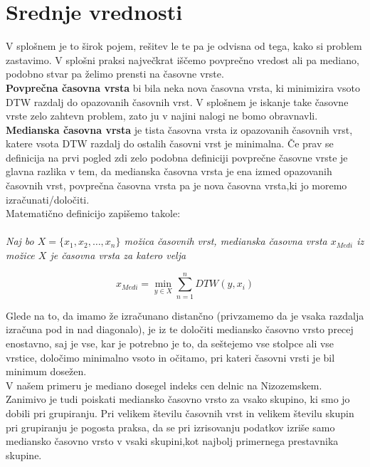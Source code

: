 \documentclass[12pt,a4paper]{article}
\begin{document}
\section{Srednje vrednosti}
V splošnem je to širok pojem, rešitev le te pa je odvisna od tega, kako si problem zastavimo.
V splošni praksi največkrat iščemo povprečno vredost ali pa mediano, podobno stvar pa želimo prensti na 
časovne vrste.\\

\textbf{Povprečna časovna vrsta} bi bila neka nova časovna vrsta, ki minimizira vsoto DTW razdalj
do opazovanih časovnih vrst. V splošnem je iskanje take časovne vrste zelo zahtevn problem, zato ju v najini
nalogi ne bomo obravnavli.\\

\textbf{Medianska časovna vrsta} je tista časovna vrsta iz opazovanih časovnih vrst, katere vsota DTW razdalj
do ostalih časovni vrst je minimalna. Če prav se definicija na prvi pogled zdi zelo podobna definiciji
povprečne časovne vrste je glavna razlika v tem, da medianska časovna vrsta je ena izmed opazovanih časovnih vrst,
povprečna časovna vrsta pa je nova časovna vrsta,ki jo moremo
izračunati/določiti.\\

Matematično definicijo zapišemo takole:\\
\\
\emph{Naj bo $X=\{x_{1},x_{2},\dots,x_{n}\}$ možica časovnih vrst, medianska časovna vrsta $x_{Medi}$ iz možice $X$ je časovna vrsta za katero velja}
\begin{center}\[x_{Medi}=\min_{y \in X} \sum_{n=1}^{n} DTW(y,x_{i}) \]\end{center} 

Glede na to, da imamo že izračunano distančno  (privzamemo da je vsaka razdalja izračuna pod in nad diagonalo), je iz te določiti mediansko časovno vrsto precej enostavno, saj je vse, kar je
potrebno je to, da seštejemo vse stolpce ali vse vrstice, določimo minimalno vsoto in očitamo, pri kateri časovni vrsti je bil minimum dosežen.\\

V našem primeru je mediano dosegel indeks cen delnic na Nizozemskem. Zanimivo je tudi poiskati mediansko časovno vrsto za vsako skupino, ki smo jo 
dobili pri grupiranju. Pri velikem številu časovnih vrst in velikem številu skupin pri grupiranju je pogosta
praksa, da se pri izrisovanju podatkov izriše samo mediansko časovno vrsto v vsaki skupini,kot najbolj primernega prestavnika skupine.
\end{document}

